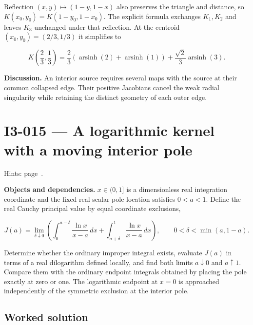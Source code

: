 \documentclass[11pt,oneside,openany]{book}
\begin{document}
Reflection \((x,y)\mapsto(1-y,1-x)\) also preserves the triangle and distance, so \(K(x_0,y_0)=K(1-y_0,1-x_0)\). The explicit formula exchanges \(K_1,K_2\) and leaves \(K_3\) unchanged under that reflection. At the centroid \((x_0,y_0)=(2/3,1/3)\) it simplifies to

\[
K\left(\frac23,\frac13\right)
=\frac23\left(\operatorname{arsinh}(2)+\operatorname{arsinh}(1)\right)
+\frac{\sqrt2}{3}\operatorname{arsinh}(3).
\]

\textbf{Discussion.} An interior source requires several maps with the source at their common collapsed edge. Their positive Jacobians cancel the weak radial singularity while retaining the distinct geometry of each outer edge.
\clearpage
\section{I3-015 --- A logarithmic kernel with a moving interior pole}
\label{problem:I3-015}
{\small Hints: page~\pageref{hints:I3-015}.}\par\medskip

\textbf{Objects and dependencies.} \(x\in(0,1]\) is a dimensionless real integration coordinate and the fixed real scalar pole location satisfies \(0<a<1\). Define the real Cauchy principal value by equal coordinate exclusions,

\[
J(a)=\lim_{\delta\downarrow0}\left(
\int_0^{a-\delta}\frac{\ln x}{x-a}\,dx
+\int_{a+\delta}^1\frac{\ln x}{x-a}\,dx\right),
\qquad 0<\delta<\min(a,1-a).
\]

Determine whether the ordinary improper integral exists, evaluate \(J(a)\) in terms of a real dilogarithm defined locally, and find both limits \(a\downarrow0\) and \(a\uparrow1\). Compare them with the ordinary endpoint integrals obtained by placing the pole exactly at zero or one. The logarithmic endpoint at \(x=0\) is approached independently of the symmetric exclusion at the interior pole.
\subsection*{Worked solution}
\end{document}
